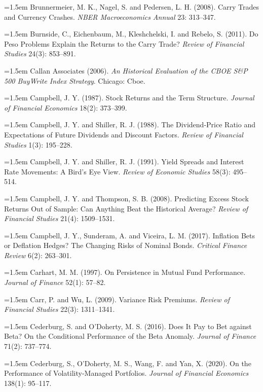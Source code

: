 \hangindent=1.5em Brunnermeier, M. K., Nagel, S. and Pedersen, L. H. (2008). Carry Trades and Currency Crashes. \emph{NBER Macroeconomics Annual} 23: 313--347.

\hangindent=1.5em Burnside, C., Eichenbaum, M., Kleshchelski, I. and Rebelo, S. (2011). Do Peso Problems Explain the Returns to the Carry Trade? \emph{Review of Financial Studies} 24(3): 853--891.

\hangindent=1.5em Callan Associates (2006). \emph{An Historical Evaluation of the CBOE S\&P 500 BuyWrite Index Strategy}. Chicago: Cboe.

\hangindent=1.5em Campbell, J. Y. (1987). Stock Returns and the Term Structure. \emph{Journal of Financial Economics} 18(2): 373--399.

\hangindent=1.5em Campbell, J. Y. and Shiller, R. J. (1988). The Dividend-Price Ratio and Expectations of Future Dividends and Discount Factors. \emph{Review of Financial Studies} 1(3): 195--228.

\hangindent=1.5em Campbell, J. Y. and Shiller, R. J. (1991). Yield Spreads and Interest Rate Movements: A Bird's Eye View. \emph{Review of Economic Studies} 58(3): 495--514.

\hangindent=1.5em Campbell, J. Y. and Thompson, S. B. (2008). Predicting Excess Stock Returns Out of Sample: Can Anything Beat the Historical Average? \emph{Review of Financial Studies} 21(4): 1509--1531.

\hangindent=1.5em Campbell, J. Y., Sunderam, A. and Viceira, L. M. (2017). Inflation Bets or Deflation Hedges? The Changing Risks of Nominal Bonds. \emph{Critical Finance Review} 6(2): 263--301.

\hangindent=1.5em Carhart, M. M. (1997). On Persistence in Mutual Fund Performance. \emph{Journal of Finance} 52(1): 57--82.

\hangindent=1.5em Carr, P. and Wu, L. (2009). Variance Risk Premiums. \emph{Review of Financial Studies} 22(3): 1311--1341.

\hangindent=1.5em Cederburg, S. and O'Doherty, M. S. (2016). Does It Pay to Bet against Beta? On the Conditional Performance of the Beta Anomaly. \emph{Journal of Finance} 71(2): 737--774.

\hangindent=1.5em Cederburg, S., O'Doherty, M. S., Wang, F. and Yan, X. (2020). On the Performance of Volatility-Managed Portfolios. \emph{Journal of Financial Economics} 138(1): 95--117.

